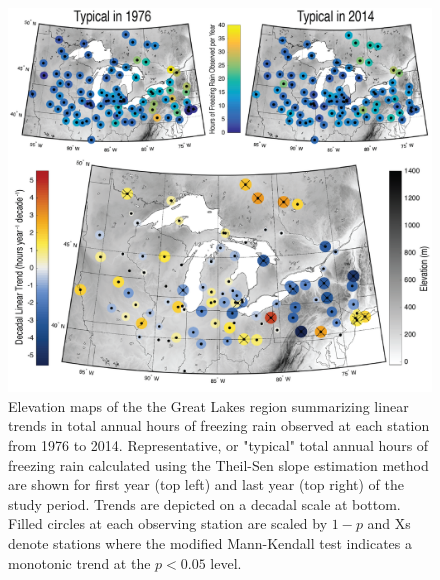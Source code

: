 \documentclass[twocol]{ametsoc}
\begin{document}
\begin{figure}
\centering
\includegraphics[width=1.0\textwidth]{FZRA_trend_maps_v2.png}
\caption{\label{fig:trendmap}Elevation maps of the the Great Lakes region summarizing linear trends in total annual hours of freezing rain observed at each station from 1976 to 2014. Representative, or "typical" total annual hours of freezing rain calculated using the Theil-Sen slope estimation method are shown for first year (top left) and last year (top right) of the study period. Trends are depicted on a decadal scale at bottom. Filled circles at each observing station are scaled by $1 - p$ and Xs denote stations where the modified Mann-Kendall test indicates a monotonic trend at the $p<0.05$ level.}
\end{figure}
\end{document}
